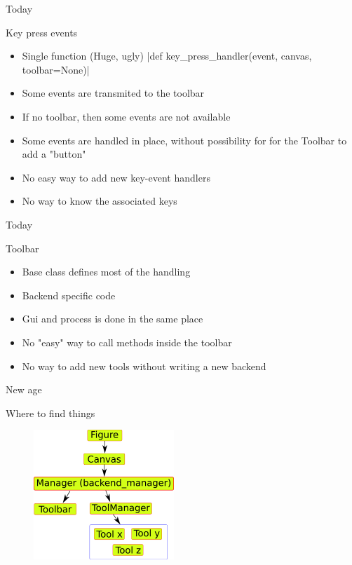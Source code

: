 \documentclass{beamer}
\begin{document}
\begin{frame}{Today}
  \begin{block}{Key press events}
      \begin{itemize}
        \item<1-> Single function (Huge, ugly)
         |def key_press_handler(event, canvas, toolbar=None)|
        \item<2-> Some events are transmited to the toolbar
        \item<3-> If no toolbar, then some events are not available
        \item<4-> Some events are handled in place, without possibility for
        for the Toolbar to add a "button"
        \item<5->No easy way to add new key-event handlers
        \item<6->No way to know the associated keys
      \end{itemize}
  \end{block}
\end{frame}

\begin{frame}{Today}
  \begin{block}{Toolbar}
      \begin{itemize}
        \item<1->Base class defines most of the handling
        \item<2->Backend specific code
        \item<3->Gui and process is done in the same place
        \item<4->No "easy" way to call methods inside the toolbar
        \item<5->No way to add new tools without writing a new backend
      \end{itemize}
  \end{block}
\end{frame}

\begin{frame}{New age}
  \begin{block}{Where to find things}
  \begin{figure}
  \includegraphics[width=200px]{mpl_classes}
  \end{figure}
\end{block}
\end{frame}
\end{document}

